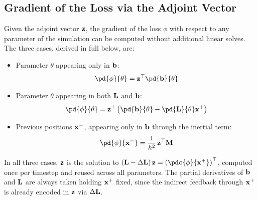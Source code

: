 \subsection{Gradient of the Loss via the Adjoint Vector}
\label{sec:diffpd_gradient_via_adj_vector}
Given the adjoint vector $\mathbf{z}$, the gradient of the loss $\phi$ with respect to any parameter of the simulation can be computed without additional linear solves. The three cases, derived in full below, are:

\begin{itemize}
    \item Parameter $\theta$ appearing only in $\mathbf{b}$:
    \begin{equation}
        \pd{\phi}{\theta} = \z^\top \pd{\bb}{\theta}
    \end{equation}
    \item Parameter $\theta$ appearing in both $\mathbf{L}$ and $\mathbf{b}$:
    \begin{equation}
        \pd{\phi}{\theta} = \z^\top\left(\pd{\bb}{\theta} - \pd{\LL}{\theta}\x^+\right)
    \end{equation}
    \item Previous positions $\mathbf{x}^-$, appearing only in $\mathbf{b}$ through the inertial term:
    \begin{equation}
        \pd{\phi}{\x^-} = \frac{1}{h^2}\,\z^\top\M
    \end{equation}
\end{itemize}
In all three cases, $\mathbf{z}$ is the solution to $(\LL - \Delta\LL)\,\z =  \left(\pdc{\phi}{\x^+}\right)^\top$, computed once per timestep and reused  across all parameters. The partial derivatives of $\mathbf{b}$ and $\mathbf{L}$  are always taken holding $\mathbf{x}^+$ fixed, since the indirect feedback through $\mathbf{x}^+$ is already encoded in $\mathbf{z}$ via $\Delta\mathbf{L}$.

